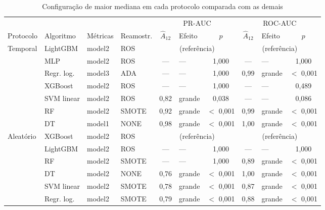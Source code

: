 \begin{table}[htbp]
    
    \centering
    \scriptsize
    \setlength{\tabcolsep}{3pt}%
    \caption{Configuração de maior mediana em cada protocolo comparada com as demais}
    \label{tab:res-a12-melhor}
    \begin{tabular}{llllclcclc}
        \toprule
         & & & & \multicolumn{3}{c}{PR-AUC} & \multicolumn{3}{c}{ROC-AUC} \\
        \cmidrule(lr){5-7}\cmidrule(lr){8-10}
        Protocolo & Algoritmo & Métricas & Reamostr. & $\hat{A}_{12}$ & Efeito & $p$ & $\hat{A}_{12}$ & Efeito & $p$ \\
        \midrule
        Temporal & LightGBM & model2 & ROS & \multicolumn{3}{c}{(referência)} & \multicolumn{3}{c}{(referência)} \\
         & MLP & model2 & ROS & --- & --- & 1,000 & --- & --- & 1,000 \\
         & Regr. log. & model3 & ADA & --- & --- & 1,000 & 0,99 & grande & $<$ 0,001 \\
         & XGBoost & model2 & ROS & --- & --- & 1,000 & --- & --- & 0,489 \\
         & SVM linear & model2 & ROS & 0,82 & grande & 0,038 & --- & --- & 0,086 \\
         & RF & model2 & SMOTE & 0,92 & grande & $<$ 0,001 & 0,99 & grande & $<$ 0,001 \\
         & DT & model1 & NONE & 0,98 & grande & $<$ 0,001 & 1,00 & grande & $<$ 0,001 \\
        \midrule
        Aleatório & XGBoost & model2 & ROS & \multicolumn{3}{c}{(referência)} & \multicolumn{3}{c}{(referência)} \\
         & LightGBM & model2 & ROS & --- & --- & 1,000 & --- & --- & 1,000 \\
         & RF & model2 & SMOTE & --- & --- & 1,000 & 0,89 & grande & $<$ 0,001 \\
         & DT & model2 & NONE & 0,76 & grande & $<$ 0,001 & 1,00 & grande & $<$ 0,001 \\
         & SVM linear & model2 & SMOTE & 0,78 & grande & $<$ 0,001 & 0,87 & grande & $<$ 0,001 \\
         & Regr. log. & model2 & SMOTE & 0,79 & grande & $<$ 0,001 & 0,88 & grande & $<$ 0,001 \\
        \bottomrule
    \end{tabular}
\end{table}%
